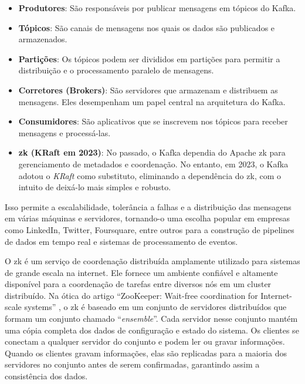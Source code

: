 \begin{itemize}
  \item \textbf{Produtores}: São responsáveis por publicar mensagens em tópicos do Kafka.
  \item \textbf{Tópicos}: São canais de mensagens nos quais os dados são publicados e armazenados.
  \item \textbf{Partições}: Os tópicos podem ser divididos em partições para permitir a distribuição e o processamento paralelo de mensagens.
  \item \textbf{Corretores (Brokers)}: São servidores que armazenam e distribuem as mensagens. Eles desempenham um papel central na arquitetura do Kafka.
  \item \textbf{Consumidores}: São aplicativos que se inscrevem nos tópicos para receber mensagens e processá-las.
  \item \textbf{\gls{zk} (KRaft em 2023)}: No passado, o Kafka dependia do Apache \gls{zk} para gerenciamento de metadados e coordenação. No entanto, em 2023, o Kafka adotou o \textit{KRaft} como substituto, eliminando a dependência do \gls{zk}, com o intuito de deixá-lo mais simples e robusto.
\end{itemize}

Isso permite a escalabilidade, tolerância a falhas e a distribuição das mensagens em várias máquinas e servidores, tornando-o uma escolha popular em empresas como LinkedIn, Twitter, Foursquare, entre outros para a construção de pipelines de dados em tempo real e sistemas de processamento de eventos.

O \gls{zk} \cite{ZookeeperGitHub} é um serviço de coordenação distribuída amplamente utilizado para sistemas de grande escala na internet. Ele fornece um ambiente confiável e altamente disponível para a coordenação de tarefas entre diversos nós em um cluster distribuído. Na ótica do artigo ``ZooKeeper: Wait-free coordination for Internet-scale systems'' \cite{ZooKeeperWaitFree:2010}, o \gls{zk} é baseado em um conjunto de servidores distribuídos que formam um conjunto chamado ``\textit{ensemble}''. Cada servidor nesse conjunto mantém uma cópia completa dos dados de configuração e estado do sistema. Os clientes se conectam a qualquer servidor do conjunto e podem ler ou gravar informações. Quando os clientes gravam informações, elas são replicadas para a maioria dos servidores no conjunto antes de serem confirmadas, garantindo assim a consistência dos dados. 

